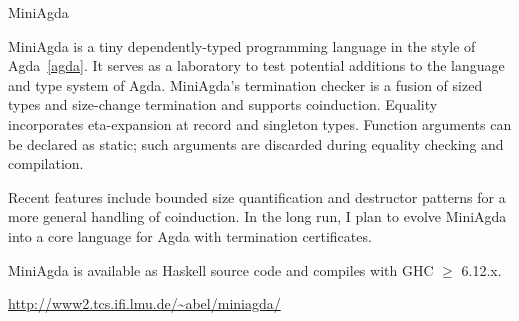\begin{hcarentry}{MiniAgda}
\makeheader

MiniAgda is a tiny dependently-typed programming language in the style
of Agda~\cref{agda}. It serves as a laboratory to test
potential additions to the
language and type system of Agda. MiniAgda's termination checker is a
fusion of sized types and size-change termination and supports
coinduction. Equality incorporates eta-expansion at record and
singleton types. Function arguments can be declared as static; such
arguments are discarded during equality checking and compilation.

Recent features include bounded size quantification and destructor
patterns for a more general handling of coinduction.  In the long
run, I plan to evolve MiniAgda into a core language for Agda with
termination certificates.

MiniAgda is available as Haskell source code and compiles with GHC
$\geq$ 6.12.x.

\FurtherReading
  \url{http://www2.tcs.ifi.lmu.de/\~abel/miniagda/}
\end{hcarentry}
